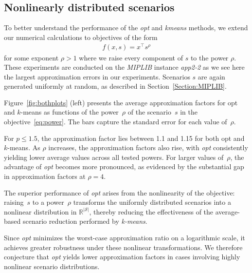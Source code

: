 \documentclass{article}
\begin{document}
\subsection{Nonlinearly distributed scenarios}
To better understand the performance of the \emph{opt} and \emph{kmeans} methods, we extend our numerical calculations to objectives of the form
\begin{align}\label{eq:power}
	f(x, s) = x^\top s^\rho
\end{align}
for some exponent $\rho>1$ where we raise every component of $s$ to the power $\rho$.
These experiments are conducted on the \emph{MIPLIB} instance \emph{app2-2} as we see here the largest approximation errors in our experiments.
Scenarios $s$ are again generated uniformly at random, as described in Section~\ref{Section:MIPLIB}.

Figure~\ref{fig:bothplots} (left) presents the average approximation factors for opt and $k$-means as functions of the power~$\rho$ of the scenario~$s$ in the objective~\eqref{eq:power}.
The bars capture the standard error for each value of~$\rho$.

For $p \leq 1.5$, the approximation factor lies between 1.1 and 1.15 for both opt and $k$-means.
As $\rho$ increases, the approximation factors also rise, with \emph{opt} consistently yielding lower average values across all tested powers.
For larger values of~$\rho$, the advantage of \emph{opt} becomes more pronounced, as evidenced by the substantial gap in approximation factors at $\rho = 4$.

The superior performance of \emph{opt} arises from the nonlinearity of the objective:
raising~$s$ to a power~$\rho$ transforms the uniformly distributed scenarios into a nonlinear distribution in $\mathbb{R}^{|\mathcal{S}|}$, thereby reducing the effectiveness of the average-based scenario reduction performed by \emph{k-means}. %

Since \emph{opt} minimizes the worst-case approximation ratio on a logarithmic scale, it achieves greater robustness under these nonlinear transformations.
We therefore conjecture that \emph{opt} yields lower approximation factors in cases involving highly nonlinear scenario distributions. %
\end{document}
